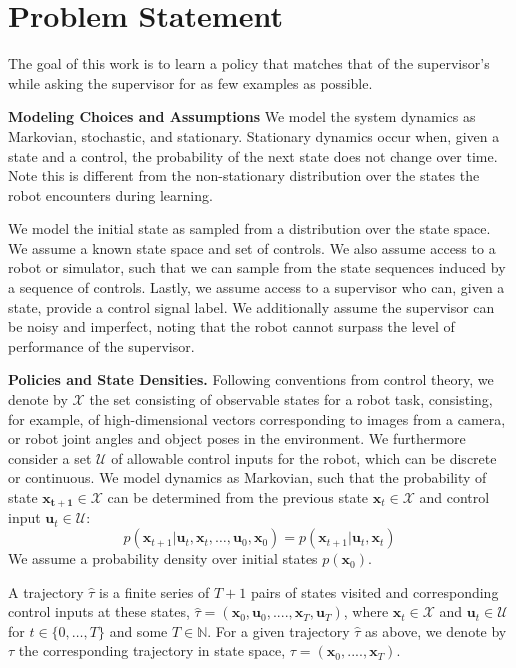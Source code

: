 \documentclass[10pt, conference]{ieeeconf}      %
\newcommand{\bu}{\mathbf{u}}
\newcommand{\bx}{\mathbf{x}}
\begin{document}
\section{Problem Statement}
The goal of this work is to learn a policy that matches that of the supervisor's while asking the supervisor for as few examples as possible.


\noindent\textbf{Modeling Choices and Assumptions}  We model the system dynamics as Markovian, stochastic, and stationary. Stationary dynamics occur when, given a state and a control, the probability of the next state does not change over time. Note this is different from the non-stationary distribution over the states the robot encounters during learning. 

We model the initial state as sampled from a distribution over the state space.
We assume a known state space and set of controls. We also assume access to a robot or simulator, such that we  can sample from the state sequences induced by a sequence of controls.   Lastly, we assume access to a supervisor who can, given a state, provide a control signal label. We additionally assume the supervisor can be noisy and imperfect, noting that the robot cannot surpass the level of performance of the supervisor. 

\noindent\textbf{Policies and State Densities.}
Following conventions from control theory, we denote by $\mathcal{X}$ the set consisting of observable states for a robot task, consisting, for example, of 
high-dimensional vectors corresponding to images from a camera, or robot joint angles and object poses in the environment.
We furthermore consider a set $\mathcal{U}$ of allowable control inputs for the robot, which can be discrete or
continuous. We model dynamics as Markovian, such that the probability of state $\mathbf{x_{t+1}}\in
\mathcal{X}$ can be determined from the previous state $\mathbf{x}_t\in\mathcal{X}$ and control input $\mathbf{u}_t\in
\mathcal{U}$: 
$$p(\bx_{t+1}|\bu_{t},\bx_{t}, \ldots, \bu_{0}, \bx_{0})=p(\bx_{t+1}|\bu_{t}, \bx_t)$$
We assume a probability density over initial states $p(\bx_0)$.

A trajectory $\hat{\tau}$ is a finite series of $T+1$ pairs of states visited and corresponding
control inputs at these states, $\hat{\tau} = (\mathbf{x}_0,\mathbf{u}_0, ...., \mathbf{x}_T,\mathbf{u}_T)$, where $\bx_t\in \mathcal{X}$
and $\bu_t\in \mathcal{U}$ for $t\in \{0, \ldots, T\}$ and some $T\in \mathbb{N}$.  
For a given trajectory $\hat{\tau}$ as above, we denote by ${\tau}$ the corresponding trajectory in state space,
${\tau} = (\bx_0,....,\bx_T)$.
\end{document}
